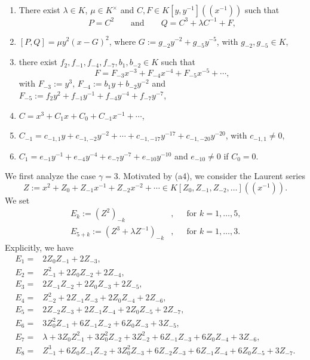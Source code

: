 \documentclass[reqno,a4paper]{amsart}
\theoremstyle{definition}
\theoremstyle{remark}
\begin{document}
\begin{enumerate}

\smallskip

\item[(b1)] There exist $\lambda\in K$, $\mu\in K^{\times}$ and $C,F\in K[y,y^{-1}]((x^{-1}))$ such that
$$
P=C^2\qquad\text{and}\qquad Q=C^3+\lambda C^{-1}+F,
$$

\smallskip

\item[(b2)] $[P,Q]=\mu  y^2 (x-G)^2$, where $G:= g_{-2} y^{-2} + g_{-5} y^{-5}$, with $g_{-2},g_{-5}\in K$,

\smallskip

\item[(b3)] there exist  $f_2,f_{-1},f_{-4},f_{-7},b_1,b_{-2}\in K$ such that
$$
F=F_{-3} x^{-3}+F_{-4} x^{-4}+F_{-5} x^{-5}+\cdots,
$$
with $F_{-3}:=y^3$, $F_{-4} := b_1 y + b_{-2} y^{-2}$ and $F_{-5} :=
f_2 y^2 + f_{-1} y^{-1} + f_{-4} y^{-4} + f_{-7} y^{-7}$,

\smallskip

\item[(b4)] $C=x^3+C_1 x+C_0+C_{-1}x^{-1}+\cdots$,

\smallskip

\item[(b5)] $C_{-1}=c_{-1,1} y+ c_{-1,-2} y^{-2}+\cdots+ c_{-1,-17}y^{-17}+ c_{-1,-20}y^{-20}$,
with $c_{-1,1}\ne 0$,

\smallskip

\item[(b6)] $C_1 = e_{-1} y^{-1} + e_{-4} y^{-4} + e_{-7} y^{-7} + e_{-10} y^{-10}$ and
$e_{-10}\ne 0$ if $C_0= 0$.

\smallskip

\end{enumerate}
We first analyze the case $\gamma=3$. Motivated by (a4), we consider the Laurent series
$$
Z := x^2+Z_0+Z_{-1}x^{-1}+Z_{-2}x^{-2}+\cdots\in K[Z_0,Z_{-1},Z_{-2},\dots]((x^{-1})).
$$
We set
\begin{equation}
\begin{aligned}
E_k:=(Z^2)_{-k} & , && \text{for $k=1,\dots, 5$,}\\
%
E_{5+k}:=\left( Z^3+\lambda Z^{-1}\right)_{-k} & , &&\text{for $k=1,\dots,3$.}
\end{aligned}
\end{equation}
Explicitly, we have
\begin{align*}
E_1 =& 2 Z_0 Z_{-1} + 2 Z_{-3},\\
E_2 =& Z_{-1}^2 + 2 Z_0 Z_{-2} + 2 Z_{-4},\\
E_3 =& 2 Z_{-1} Z_{-2} + 2 Z_0 Z_{-3} + 2 Z_{-5},\\
E_4 =& Z_{-2}^2 + 2 Z_{-1} Z_{-3} + 2 Z_0 Z_{-4} + 2 Z_{-6},\\
E_5 =& 2 Z_{-2} Z_{-3} + 2 Z_{-1} Z_{-4} + 2 Z_0 Z_{-5} + 2 Z_{-7},\\
E_6 =& 3 Z_0^2 Z_{-1} + 6 Z_{-1} Z_{-2} + 6 Z_0 Z_{-3} + 3 Z_{-5},\\
E_7 =& \lambda+3 Z_0 Z_{-1}^2 + 3 Z_0^2 Z_{-2} + 3 Z_{-2}^2 + 6 Z_{-1} Z_{-3} + 6 Z_0 Z_{-4} +3 Z_{-6}, \\
E_8 =& Z_{-1}^3 + 6 Z_0 Z_{-1} Z_{-2} + 3 Z_0^2 Z_{-3} + 6 Z_{-2} Z_{-3} + 6 Z_{-1} Z_{-4} + 6 Z_0 Z_{-5} + 3 Z_{-7}.
\end{align*}
\end{document}
